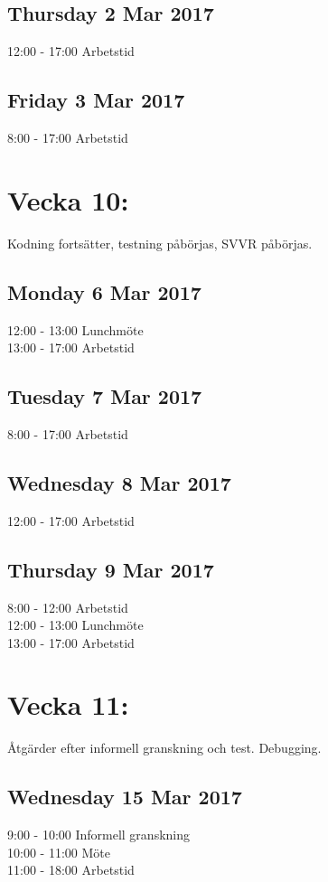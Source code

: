\documentclass[paper=a4, fontsize=11pt,twoside]{article}
\begin{document}
\subsection*{Thursday 2 Mar 2017}
	12:00 - 17:00 Arbetstid\\
\subsection*{Friday 3 Mar 2017}
	8:00 - 17:00 Arbetstid\\



\section*{Vecka 10:}
Kodning fortsätter, testning påbörjas, SVVR påbörjas.\\
\subsection*{Monday 6 Mar 2017}
	12:00 - 13:00 Lunchmöte\\
	13:00 - 17:00 Arbetstid\\
\subsection*{Tuesday 7 Mar 2017}
	8:00 - 17:00 Arbetstid\\
\subsection*{Wednesday 8 Mar 2017}
	12:00 - 17:00 Arbetstid\\
\subsection*{Thursday 9 Mar 2017}
	8:00 - 12:00 Arbetstid\\
	12:00 - 13:00 Lunchmöte\\
	13:00 - 17:00 Arbetstid\\



\section*{Vecka 11:}
Åtgärder efter informell granskning och test. Debugging.\\
\subsection*{Wednesday 15 Mar 2017}
	9:00 - 10:00 Informell granskning\\
	10:00 - 11:00 Möte\\
	11:00 - 18:00 Arbetstid\\
\end{document}
